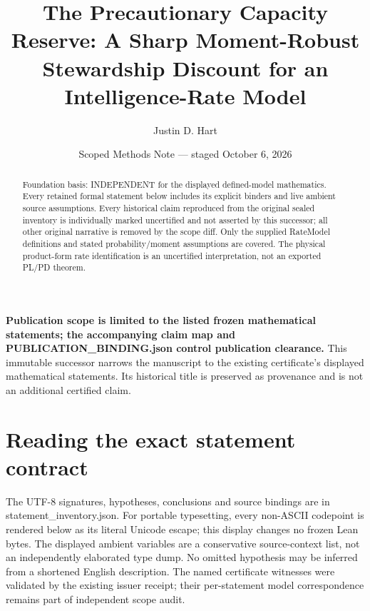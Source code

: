 \documentclass[11pt]{article}
\title{The Precautionary Capacity Reserve: A Sharp Moment-Robust Stewardship Discount for an Intelligence-Rate Model}
\author{Justin D. Hart}
\date{Scoped Methods Note --- staged October 6, 2026}
\begin{document}
\maketitle
\noindent\textbf{Publication scope is limited to the listed frozen mathematical statements; the accompanying claim map and PUBLICATION\_\allowbreak{}BINDING.json control publication clearance.} This immutable successor narrows the manuscript to the existing certificate's displayed mathematical statements. Its historical title is preserved as provenance and is not an additional certified claim.
\begin{abstract}
Foundation basis: INDEPENDENT for the displayed defined-model mathematics. Every retained formal statement below includes its explicit binders and live ambient source assumptions. Every historical claim reproduced from the original sealed inventory is individually marked uncertified and not asserted by this successor; all other original narrative is removed by the scope diff. Only the supplied RateModel definitions and stated probability/moment assumptions are covered. The physical product-form rate identification is an uncertified interpretation, not an exported PL/PD theorem.
\end{abstract}
\section*{Reading the exact statement contract}
The UTF-8 signatures, hypotheses, conclusions and source bindings are in statement\_\allowbreak{}inventory.json. For portable typesetting, every non-ASCII codepoint is rendered below as its literal Unicode escape; this display changes no frozen Lean bytes. The displayed ambient variables are a conservative source-context list, not an independently elaborated type dump. No omitted hypothesis may be inferred from a shortened English description. The named certificate witnesses were validated by the existing issuer receipt; their per-statement model correspondence remains part of independent scope audit.
\end{document}

